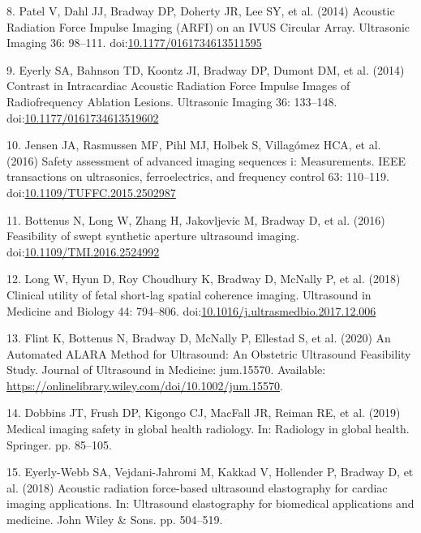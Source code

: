 \documentclass[
]{article}
\newenvironment{cslreferences}%
  {}%
  {\par}
\begin{document}
\begin{cslreferences}
\leavevmode\hypertarget{ref-Patel2014}{}%
8. Patel V, Dahl JJ, Bradway DP, Doherty JR, Lee SY, et al. (2014)
Acoustic Radiation Force Impulse Imaging (ARFI) on an IVUS Circular
Array. Ultrasonic Imaging 36: 98--111.
doi:\href{https://doi.org/10.1177/0161734613511595}{10.1177/0161734613511595}

\leavevmode\hypertarget{ref-Eyerly2014}{}%
9. Eyerly SA, Bahnson TD, Koontz JI, Bradway DP, Dumont DM, et al.
(2014) Contrast in Intracardiac Acoustic Radiation Force Impulse Images
of Radiofrequency Ablation Lesions. Ultrasonic Imaging 36: 133--148.
doi:\href{https://doi.org/10.1177/0161734613519602}{10.1177/0161734613519602}

\leavevmode\hypertarget{ref-jensen2016}{}%
10. Jensen JA, Rasmussen MF, Pihl MJ, Holbek S, Villagómez HCA, et al.
(2016) Safety assessment of advanced imaging sequences i: Measurements.
IEEE transactions on ultrasonics, ferroelectrics, and frequency control
63: 110--119.
doi:\href{https://doi.org/10.1109/TUFFC.2015.2502987}{10.1109/TUFFC.2015.2502987}

\leavevmode\hypertarget{ref-bottenus2016}{}%
11. Bottenus N, Long W, Zhang H, Jakovljevic M, Bradway D, et al. (2016)
Feasibility of swept synthetic aperture ultrasound imaging.
doi:\href{https://doi.org/10.1109/TMI.2016.2524992}{10.1109/TMI.2016.2524992}

\leavevmode\hypertarget{ref-Long2017umb}{}%
12. Long W, Hyun D, Roy Choudhury K, Bradway D, McNally P, et al. (2018)
Clinical utility of fetal short-lag spatial coherence imaging.
Ultrasound in Medicine and Biology 44: 794--806.
doi:\href{https://doi.org/10.1016/j.ultrasmedbio.2017.12.006}{10.1016/j.ultrasmedbio.2017.12.006}

\leavevmode\hypertarget{ref-Flint2020}{}%
13. Flint K, Bottenus N, Bradway D, McNally P, Ellestad S, et al. (2020)
An Automated ALARA Method for Ultrasound: An Obstetric Ultrasound
Feasibility Study. Journal of Ultrasound in Medicine: jum.15570.
Available: \url{https://onlinelibrary.wiley.com/doi/10.1002/jum.15570}.

\leavevmode\hypertarget{ref-dobbins2019medical}{}%
14. Dobbins JT, Frush DP, Kigongo CJ, MacFall JR, Reiman RE, et al.
(2019) Medical imaging safety in global health radiology. In: Radiology
in global health. Springer. pp. 85--105.

\leavevmode\hypertarget{ref-eyerly2018acoustic}{}%
15. Eyerly-Webb SA, Vejdani-Jahromi M, Kakkad V, Hollender P, Bradway D,
et al. (2018) Acoustic radiation force-based ultrasound elastography for
cardiac imaging applications. In: Ultrasound elastography for biomedical
applications and medicine. John Wiley \& Sons. pp. 504--519.


\end{cslreferences}
\end{document}
